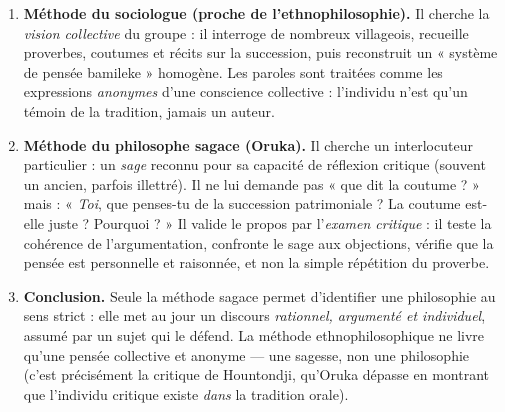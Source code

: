\documentclass[11pt]{article}
\newcommand{\cle}[1]{{\popxbold\color{popdark}#1}}
\begin{document}
\begin{corrige}
\begin{enumerate}
    \item \textbf{Méthode du sociologue (proche de l'ethnophilosophie).} Il cherche la \emph{vision collective} du groupe : il interroge de nombreux villageois, recueille proverbes, coutumes et récits sur la succession, puis reconstruit un « système de pensée bamileke » homogène. Les paroles sont traitées comme les expressions \emph{anonymes} d'une conscience collective : l'individu n'est qu'un témoin de la tradition, jamais un auteur.
    \item \textbf{Méthode du philosophe sagace (Oruka).} Il cherche un interlocuteur particulier : un \emph{sage} reconnu pour sa capacité de réflexion critique (souvent un ancien, parfois illettré). Il ne lui demande pas « que dit la coutume ? » mais : « \emph{Toi}, que penses-tu de la succession patrimoniale ? La coutume est-elle juste ? Pourquoi ? » Il valide le propos par l'\emph{examen critique} : il teste la cohérence de l'argumentation, confronte le sage aux objections, vérifie que la pensée est personnelle et raisonnée, et non la simple répétition du proverbe.
    \item \textbf{Conclusion.} Seule la méthode sagace permet d'identifier une \cle{philosophie} au sens strict : elle met au jour un discours \emph{rationnel, argumenté et individuel}, assumé par un sujet qui le défend. La méthode ethnophilosophique ne livre qu'une pensée collective et anonyme — une sagesse, non une philosophie (c'est précisément la critique de Hountondji, qu'Oruka dépasse en montrant que l'individu critique existe \emph{dans} la tradition orale).
\end{enumerate}
\end{corrige}
\end{document}
